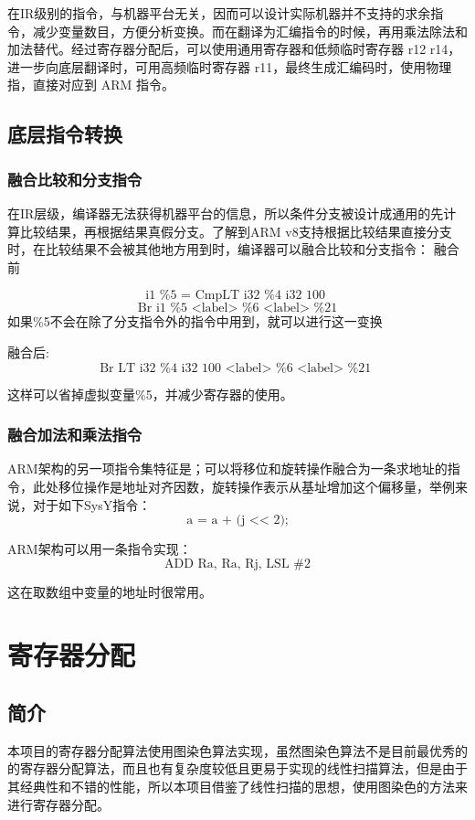 在IR级别的指令，与机器平台无关，因而可以设计实际机器并不支持的求余指令，减少变量数目，方便分析变换。而在翻译为汇编指令的时候，再用乘法除法和加法替代。经过寄存器分配后，可以使用通用寄存器和低频临时寄存器 r12 r14，进一步向底层翻译时，可用高频临时寄存器 r11，最终生成汇编码时，使用物理指，直接对应到 ARM 指令。


\subsection{底层指令转换}

\subsubsection{融合比较和分支指令}

在IR层级，编译器无法获得机器平台的信息，所以条件分支被设计成通用的先计算比较结果，再根据结果真假分支。了解到ARM v8支持根据比较结果直接分支时，在比较结果不会被其他地方用到时，编译器可以融合比较和分支指令：
融合前

$$
\text{i1 \%5  = CmpLT i32 \%4 i32 100 }
$$
$$
\text{Br i1 \%5 <label> \%6 <label> \%21}
$$
如果\%5不会在除了分支指令外的指令中用到，就可以进行这一变换

融合后:
$$
\text{Br LT i32 \%4 i32 100 <label> \%6 <label> \%21 }
$$

这样可以省掉虚拟变量\%5，并减少寄存器的使用。


\subsubsection{融合加法和乘法指令}

ARM架构的另一项指令集特征是；可以将移位和旋转操作融合为一条求地址的指令，此处移位操作是地址对齐因数，旋转操作表示从基址增加这个偏移量，举例来说，对于如下SysY指令：
$$
\text{a = a + (j  << 2);
}
$$

ARM架构可以用一条指令实现：
$$
\text{ADD  Ra, Ra, Rj, LSL \#2}
$$

这在取数组中变量的地址时很常用。


\section{寄存器分配}

\subsection{简介}

本项目的寄存器分配算法使用图染色算法实现，虽然图染色算法不是目前最优秀的的寄存器分配算法，而且也有复杂度较低且更易于实现的线性扫描算法，但是由于其经典性和不错的性能，所以本项目借鉴了线性扫描的思想，使用图染色的方法来进行寄存器分配。

